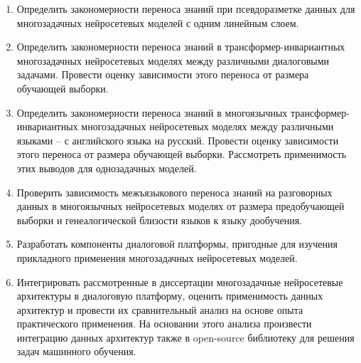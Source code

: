 \begin{enumerate}
  \item {Определить закономерности переноса знаний при псевдоразметке данных для многозадачных нейросетевых моделей с одним линейным слоем.}
  \item {Определить закономерности переноса знаний в трансформер-инвариантных многозадачных нейросетевых моделях между различными диалоговыми задачами. Провести оценку зависимости этого переноса от размера обучающей выборки.}
  \item {Определить закономерности переноса знаний в многоязычных трансформер-инвариантных многозадачных нейросетевых моделях между различными языками -- с английского языка на русский. Провести оценку зависимости этого переноса от размера обучающей выборки. Рассмотреть применимость этих выводов для однозадачных моделей.}
  \item {Проверить зависимость межъязыкового переноса знаний на разговорных данных в многоязычных нейросетевых моделях от размера предобучающей выборки и генеалогической близости языков к языку дообучения.}
  \item {Разработать компоненты диалоговой платформы, пригодные для изучения прикладного применения многозадачных нейросетевых моделей.} %
  \item {Интегрировать рассмотренные в диссертации многозадачные нейросетевые архитектуры в диалоговую платформу, оценить применимость данных архитектур и провести их сравнительный анализ на основе опыта практического применения. На основании этого анализа произвести интеграцию данных архитектур также в open-source библиотеку для решения задач машинного обучения.}%
  \newline
  \newline
\end{enumerate}


